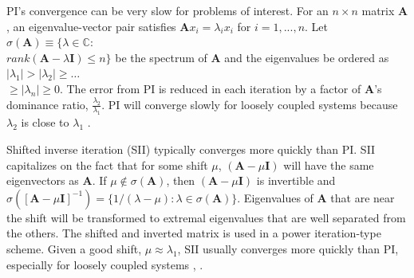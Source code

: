 \documentclass[preprint,12pt]{elsarticle}
\newcommand{\ve}[1]{\ensuremath{\mathbf{#1}}}
\begin{document}
PI's convergence can be very slow for problems of interest. For an $n \times n$ matrix $\ve{A}$, an eigenvalue-vector pair satisfies $\ve{A}x_{i} = \lambda_{i}x_{i}$ for $i = 1,...,n$. Let $\sigma(\ve{A}) \equiv \{\lambda \in \mathbb{C} : $\\$ rank(\ve{A} - \lambda \ve{I}) \le n\}$ be the spectrum of $\ve{A}$ and the eigenvalues be ordered as $|\lambda_{1}| > |\lambda_{2}| \ge \dots $\\$\ge |\lambda_{n}| \ge 0$. The error from PI is reduced in each iteration by a factor of $\ve{A}$'s dominance ratio, $\frac{\lambda_{2}}{\lambda_{1}}$. PI will converge slowly for loosely coupled systems because $\lambda_{2}$ is close to $\lambda_{1}$ \cite{Trefethen1997}. 

Shifted inverse iteration (SII) typically converges more quickly than PI. SII capitalizes on the fact that for some shift $\mu$, $(\ve{A} - \mu \ve{I})$ will have the same eigenvectors as $\ve{A}$. If $\mu \notin \sigma(\ve{A})$, then $(\ve{A} - \mu \ve{I})$ is invertible and $\sigma([\ve{A} - \mu \ve{I}]^{-1}) = \{1/(\lambda - \mu):\lambda \in \sigma(\ve{A})\}$. Eigenvalues of $\ve{A}$ that are near the shift will be transformed to extremal eigenvalues that are well separated from the others. The shifted and inverted matrix is used in a power iteration-type scheme. Given a good shift, $\mu \approx \lambda_1$, SII usually converges more quickly than PI, especially for loosely coupled systems \cite{Trefethen1997}, \cite{Allen2002}.

\end{document}
